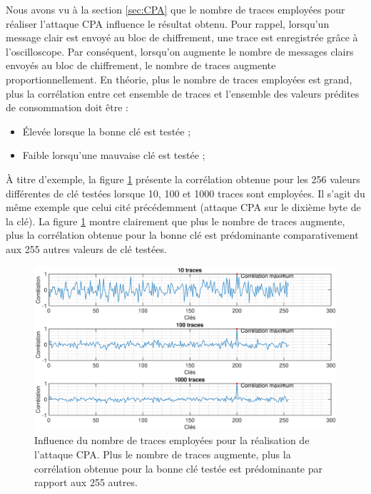 \documentclass[oneside]{book}
\begin{document}
Nous avons vu à la section \ref{sec:CPA} que le nombre de traces employées pour réaliser l'attaque CPA influence le résultat obtenu. Pour rappel, lorsqu'un message clair est envoyé au bloc de chiffrement, une trace est enregistrée grâce à l'oscilloscope. Par conséquent, lorsqu'on augmente le nombre de messages clairs envoyés au bloc de chiffrement, le nombre de traces augmente proportionnellement. En théorie, plus le nombre de traces employées est grand, plus la corrélation entre cet ensemble de traces et l'ensemble des valeurs prédites de consommation doit être :
\begin{itemize}
\item Élevée lorsque la bonne clé est testée ;
\item Faible lorsqu'une mauvaise clé est testée ;
\end{itemize}
À titre d'exemple, la figure \ref{fig:sim_nb_traces} présente la corrélation obtenue pour les 256 valeurs différentes de clé testées lorsque 10, 100 et 1000 traces sont employées. Il s'agit du même exemple que celui cité précédemment (attaque CPA sur le dixième byte de la clé). La figure \ref{fig:sim_nb_traces} montre clairement que plus le nombre de traces augmente, plus la corrélation obtenue pour la bonne clé est prédominante comparativement aux 255 autres valeurs de clé testées.

\begin{figure}[htbp]
    \hspace{-3.3cm}
    \includegraphics[scale=0.45]{image/sim_nb_traces}
    \caption{Influence du nombre de traces employées pour la réalisation de l'attaque CPA. Plus le nombre de traces augmente, plus la corrélation obtenue pour la bonne clé testée est prédominante par rapport aux 255 autres.}
    \label{fig:sim_nb_traces} 
\end{figure}
\end{document}
